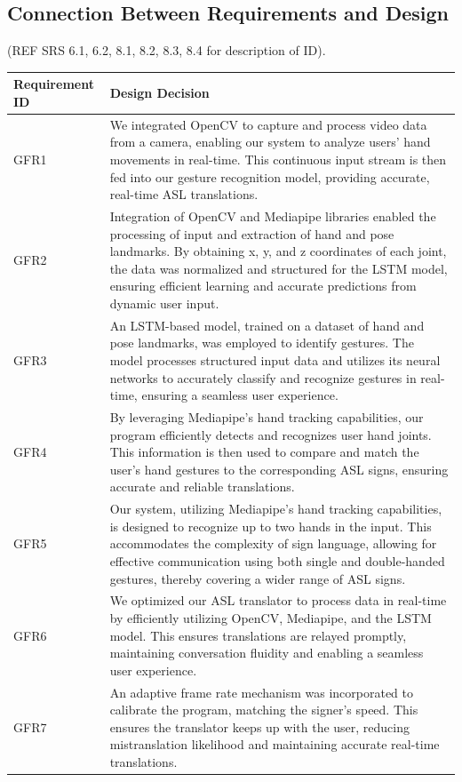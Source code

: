 \documentclass[12pt, titlepage]{article}
\begin{document}
\subsection{Connection Between Requirements and Design} \label{SecConnection}
(REF SRS 6.1, 6.2, 8.1, 8.2, 8.3, 8.4 for description of ID).

\renewcommand{\arraystretch}{1.2}
\noindent \begin{longtable}{p{}|p{}}
\hline
\textbf{Requirement ID} & \textbf{Design Decision}\\
\hline
GFR1
& We integrated OpenCV to capture and process video data from a camera, enabling our system to analyze users' hand movements in real-time. This continuous input stream is then fed into our gesture recognition model, providing accurate, real-time ASL translations.\\
\hline
GFR2
& Integration of OpenCV and Mediapipe libraries enabled the processing of input and extraction of hand and pose landmarks. By obtaining x, y, and z coordinates of each joint, the data was normalized and structured for the LSTM model, ensuring efficient learning and accurate predictions from dynamic user input.\\
\hline
GFR3
& An LSTM-based model, trained on a dataset of hand and pose landmarks, was employed to identify gestures. The model processes structured input data and utilizes its neural networks to accurately classify and recognize gestures in real-time, ensuring a seamless user experience.\\
\hline
GFR4
& By leveraging Mediapipe's hand tracking capabilities, our program efficiently detects and recognizes user hand joints. This information is then used to compare and match the user's hand gestures to the corresponding ASL signs, ensuring accurate and reliable translations.\\
\hline
GFR5
& Our system, utilizing Mediapipe's hand tracking capabilities, is designed to recognize up to two hands in the input. This accommodates the complexity of sign language, allowing for effective communication using both single and double-handed gestures, thereby covering a wider range of ASL signs.\\
\hline
GFR6
& We optimized our ASL translator to process data in real-time by efficiently utilizing OpenCV, Mediapipe, and the LSTM model. This ensures translations are relayed promptly, maintaining conversation fluidity and enabling a seamless user experience.\\
\hline
GFR7
& An adaptive frame rate mechanism was incorporated to calibrate the program, matching the signer's speed. This ensures the translator keeps up with the user, reducing mistranslation likelihood and maintaining accurate real-time translations.\\

\end{longtable}
\end{document}
